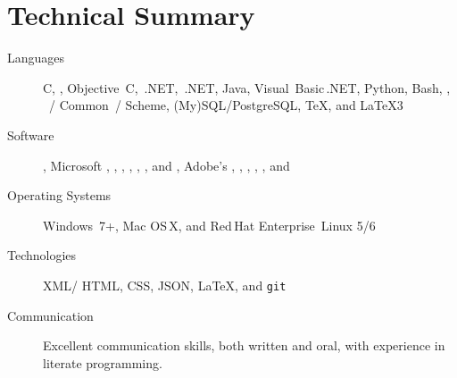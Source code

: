 \documentclass{bettercv}
\begin{document}
\maketitle
\vfill
\section{Technical Summary}
\begin{minipage}{\textwidth}
\begin{description}
\item[Languages]
  C,
  \CPP,
  Objective~C,
  \CPP\,.NET,
  \CSharp\,.NET,
  Java,
  Visual~Basic\,.NET,
  Python,
  Bash,
  ,
  ~\Lisp\slash
            Common~\Lisp\slash
            Scheme,
  (My)SQL\slash PostgreSQL,
  \TeX,
  and
  \LaTeX3

\item[Software]
  ,
  Microsoft ,
            ,
            ,
            ,
            ,
            ,
            and
            ,
  Adobe's
    ,
    ,
    ,
  ,
  ,
  and

\item[Operating Systems]
  Windows~7+,
  Mac OS\,X,
  and
  Red\,Hat Enterprise~Linux 5\slash 6

\item[Technologies]
  XML\slash
  HTML,
  CSS,
  JSON,
  \LaTeX,
  and
  \texttt{git}

\item[Communication]
  Excellent communication skills, both written and oral,
    with experience in literate programming.
\end{description}
\end{minipage}

\vfill
\end{document}
